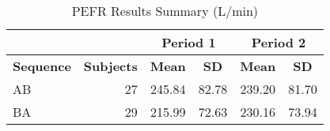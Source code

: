 \begin{table}[h]
\centering
\caption{PEFR Results Summary (L/min)}
\centering
\begin{tabular}[t]{l|r|c|c|c|c}

\multicolumn{2}{c|}{} &
\multicolumn{2}{|c|}{Period 1} &
\multicolumn{2}{|c}{Period 2} \\
\hline
\textbf{Sequence} & \textbf{Subjects} & \textbf{Mean} & \textbf{SD} & \textbf{Mean} & \textbf{SD}\\
\hline
AB & 27 & 245.84 & 82.78 & 239.20 & 81.70\\
\hline
BA & 29 & 215.99 & 72.63 & 230.16 & 73.94\\
\hline
\end{tabular}
\label{summaryTable}
\end{table}
